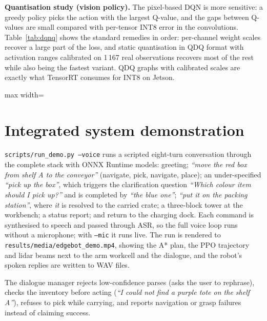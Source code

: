 \documentclass[11pt,a4paper]{article}
\newcommand{\fit}[1]{\begin{adjustbox}{max width=\linewidth}\end{adjustbox}}
\begin{document}
\textbf{Quantisation study (vision policy).} The pixel-based DQN is more sensitive: a greedy policy picks
the action with the largest Q-value, and the gaps between Q-values are small compared with per-tensor
INT8 error in the convolutions. Table~\ref{tab:dqnq} shows the standard remedies in order: per-channel
weight scales recover a large part of the loss, and static quantisation in QDQ format with activation
ranges calibrated on 1\,167 real observations recovers most of the rest while also being the fastest
variant. QDQ graphs with calibrated scales are exactly what TensorRT consumes for INT8 on Jetson.
\begin{table}[H]\centering\small\caption{INT8 quantisation of the pixel-based DQN (100 unseen layouts).}\label{tab:dqnq}
\fit{tab_dqn_quant}\end{table}

\section{Integrated system demonstration}\label{sec:system}
\texttt{scripts/run\_demo.py --voice} runs a scripted eight-turn conversation through the complete
stack with ONNX Runtime models: greeting; \emph{``move the red box from shelf A to the conveyor''}
(navigate, pick, navigate, place); an under-specified \emph{``pick up the box''}, which triggers the
clarification question \emph{``Which colour item should I pick up?''} and is completed by \emph{``the blue
one''}; \emph{``put it on the packing station''}, where \emph{it} is resolved to the carried crate; a
three-block tower at the workbench; a status report; and return to the charging dock. Each command is
synthesised to speech and passed through ASR, so the full voice loop runs without a microphone; with
\texttt{--mic} it runs live. The run is rendered to \texttt{results/media/edgebot\_demo.mp4}, showing the
A* plan, the PPO trajectory and lidar beams next to the arm workcell and the dialogue, and the robot's
spoken replies are written to WAV files.

The dialogue manager rejects low-confidence parses (asks the user to rephrase), checks the inventory
before acting (\emph{``I could not find a purple tote on the shelf A''}), refuses to pick while carrying,
and reports navigation or grasp failures instead of claiming success.

\end{document}
